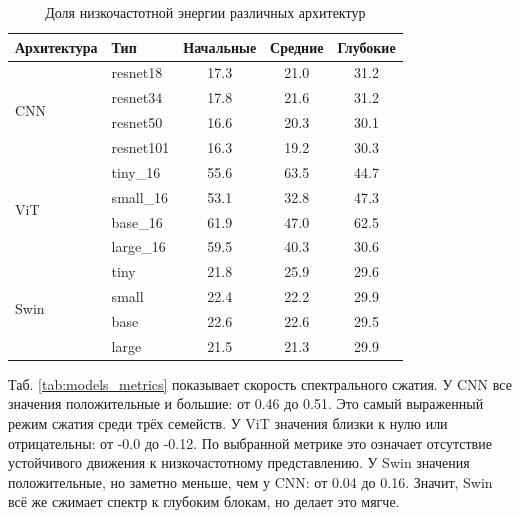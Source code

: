 \begin{table}[h]
\centering
\caption{Доля низкочастотной энергии различных архитектур} 
\label{tab:LowFrac_metrics}
\vspace{1ex} 
\begin{tabular}{llccc} %
\toprule
\textbf{Архитектура} & \textbf{Тип} & \textbf{Начальные} & \textbf{Средние} & \textbf{Глубокие} \\
\midrule

\multirow{4}{*}{CNN} & resnet18      & 17.3 & 21.0 & 31.2 \\
                     & resnet34      & 17.8 & 21.6 & 31.2 \\
                     & resnet50      & 16.6 & 20.3 & 30.1 \\
                     & resnet101     & 16.3 & 19.2 & 30.3 \\

\midrule

\multirow{4}{*}{ViT} & tiny\_16      & 55.6 & 63.5 & 44.7 \\
                     & small\_16     & 53.1 & 32.8 & 47.3 \\
                     & base\_16      & 61.9 & 47.0 & 62.5 \\
                     & large\_16     & 59.5 & 40.3 & 30.6 \\
\midrule

\multirow{4}{*}{Swin} & tiny       & 21.8 & 25.9 & 29.6 \\
                      & small      & 22.4 & 22.2 & 29.9 \\
                      & base       & 22.6 & 22.6 & 29.5 \\
                      & large      & 21.5 & 21.3 & 29.9 \\
\bottomrule
\end{tabular}
\end{table}

Таб. \ref{tab:models_metrics} показывает скорость спектрального сжатия. У CNN все значения положительные и большие: от 0.46 до 0.51. Это самый выраженный режим сжатия среди трёх семейств. У ViT значения близки к нулю или отрицательны: от -0.0 до -0.12. По выбранной метрике это означает отсутствие устойчивого движения к низкочастотному представлению. У Swin значения положительные, но заметно меньше, чем у CNN: от 0.04 до 0.16. Значит, Swin всё же сжимает спектр к глубоким блокам, но делает это мягче.

